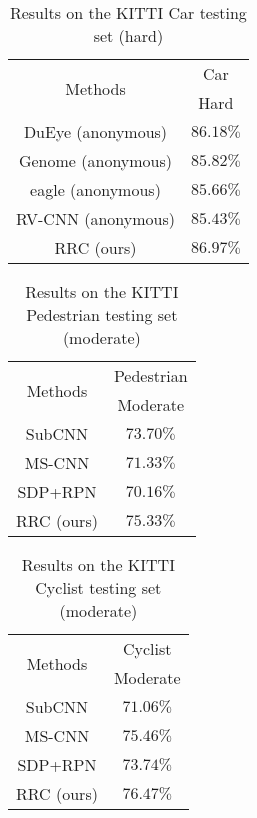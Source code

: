 \documentclass[10pt,twocolumn,letterpaper]{article}
\begin{document}
\begin{table}
\centering
\caption{Results on the KITTI Car testing set (hard)}
\label{table:final_compare2}
\begin{tabular}{|c||c|}
\hline
\hline
\multirow{2}{*}{Methods} & \multicolumn{1}{c|}{Car}\\
 &Hard\\
\hline
DuEye (anonymous)&$86.18\%$\\
Genome (anonymous)&$85.82\%$\\
eagle (anonymous)&$85.66\%$\\
RV-CNN (anonymous)&$85.43\%$\\
\hline
RRC (ours)&$86.97\%$\\
\hline
\end{tabular}
\end{table}

\begin{table}
\centering
\caption{Results on the KITTI Pedestrian testing set (moderate)}
\label{table:final_compare3}
\begin{tabular}{|c||c|}
\hline
\hline
\multirow{2}{*}{Methods} & \multicolumn{1}{c|}{Pedestrian}  \\
 &Moderate\\
\hline
SubCNN \cite{Xiang16}&$73.70\%$\\
MS-CNN \cite{Cai16}&$71.33\%$\\
SDP+RPN \cite{Yang16}&$70.16\%$\\
\hline
RRC (ours)&$75.33\%$\\
\hline
\end{tabular}
\end{table}

\begin{table}
\centering
\caption{Results on the KITTI Cyclist testing set (moderate)}
\label{table:final_compare4}
\begin{tabular}{|c||c|}
\hline
\hline
\multirow{2}{*}{Methods} & \multicolumn{1}{c|}{Cyclist}  \\
 &Moderate\\
\hline
SubCNN \cite{Xiang16}&$71.06\%$\\
MS-CNN \cite{Cai16}&$75.46\%$\\
SDP+RPN \cite{Yang16}&$73.74\%$\\
\hline
RRC (ours)&$76.47\%$\\
\hline
\end{tabular}
\end{table}
\end{document}
